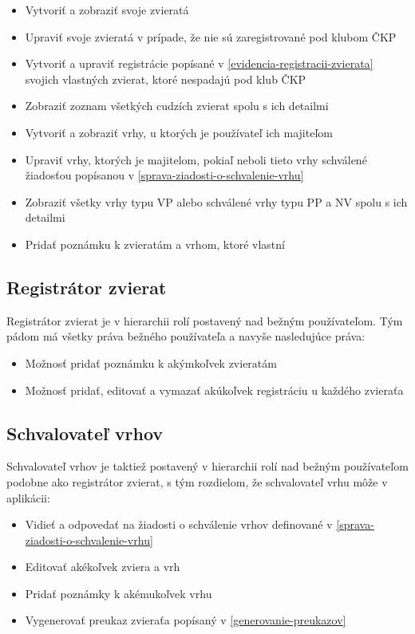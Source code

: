 \begin{itemize}
	\item Vytvoriť a zobraziť svoje zvieratá
	\item Upraviť svoje zvieratá v prípade, že nie sú zaregistrované pod klubom ČKP
	\item Vytvoriť a upraviť registrácie popísané v \ref{evidencia-registracii-zvierata} svojich vlastných zvierat, ktoré nespadajú pod klub ČKP
	\item Zobraziť zoznam všetkých cudzích zvierat spolu s ich detailmi
	\item Vytvoriť a zobraziť vrhy, u ktorých je používateľ ich majiteľom
	\item Upraviť vrhy, ktorých je majitelom, pokiaľ neboli tieto vrhy schválené žiadosťou popísanou v \ref{sprava-ziadosti-o-schvalenie-vrhu}
	\item Zobraziť všetky vrhy typu VP alebo schválené vrhy typu PP a NV spolu s ich detailmi
	\item Pridať poznámku k zvieratám a vrhom, ktoré vlastní
\end{itemize}

\subsection{Registrátor zvierat}
Registrátor zvierat je v hierarchii rolí postavený nad bežným používateľom. Tým pádom má všetky práva bežného používateľa a navyše nasledujúce práva:

\begin{itemize}
	\item Možnosť pridať poznámku k akýmkoľvek zvieratám
	\item Možnosť pridať, editovať a vymazať akúkoľvek registráciu u každého zvieraťa
\end{itemize} 

\subsection{Schvalovateľ vrhov}
Schvalovateľ vrhov je taktiež postavený v hierarchii rolí nad bežným používateľom podobne ako registrátor zvierat, s tým rozdielom, že schvalovateľ vrhu môže v aplikácii:

\begin{itemize}
	\item Vidieť a odpovedať na žiadosti o schválenie vrhov definované v \ref{sprava-ziadosti-o-schvalenie-vrhu}
	\item Editovať akékoľvek zviera a vrh
	\item Pridať poznámky k akémukoľvek vrhu
	\item Vygenerovať preukaz zvieraťa popísaný v \ref{generovanie-preukazov}
\end{itemize}

